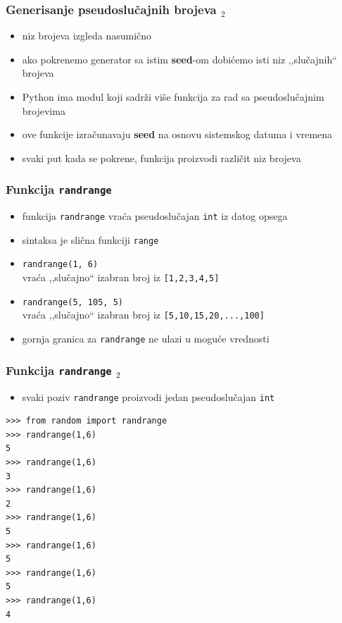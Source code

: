 \documentclass[utf8,compress]{beamer}
\begin{document}
\begin{frame}
  \frametitle{Generisanje pseudoslučajnih brojeva $_2$}
  \begin{itemize}
    \item niz brojeva izgleda nasumično
    \item ako pokrenemo generator sa istim \textbf{seed}-om dobićemo isti niz ,,slučajnih`` brojeva
    \item Python ima modul koji sadrži više funkcija za rad sa pseudoslučajnim brojevima
    \item ove funkcije izračunavaju \textbf{seed} na osnovu sistemskog datuma i vremena
    \item svaki put kada se pokrene, funkcija proizvodi različit niz brojeva
  \end{itemize}
\end{frame}

\begin{frame}
  \frametitle{Funkcija \texttt{randrange}}
  \begin{itemize}
    \item funkcija \texttt{randrange} vraća pseudoslučajan \texttt{int} iz datog opsega
    \item sintaksa je slična funkciji \texttt{range}
    \item \texttt{randrange(1, 6)} \\
      vraća ,,slučajno`` izabran broj iz \texttt{[1,2,3,4,5]}
    \item \texttt{randrange(5, 105, 5)} \\
      vraća ,,slučajno`` izabran broj iz \texttt{[5,10,15,20,...,100]}
    \item gornja granica za \texttt{randrange} ne ulazi u moguće vrednosti
  \end{itemize}
\end{frame}

\begin{frame}[fragile,shrink=5]
  \frametitle{Funkcija \texttt{randrange} $_2$}
  \begin{itemize}
    \item svaki poziv \texttt{randrange} proizvodi jedan pseudoslučajan \texttt{int}
  \end{itemize}
\begin{verbatim}
>>> from random import randrange
>>> randrange(1,6)
5
>>> randrange(1,6)
3
>>> randrange(1,6)
2
>>> randrange(1,6)
5
>>> randrange(1,6)
5
>>> randrange(1,6)
5
>>> randrange(1,6)
4
\end{verbatim}
\end{frame}
\end{document}
